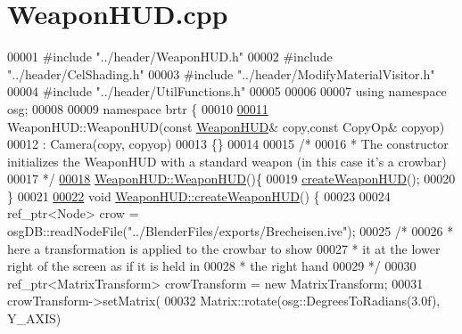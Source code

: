 \hypertarget{_weapon_h_u_d_8cpp_source}{\section{Weapon\+H\+U\+D.\+cpp}
\label{_weapon_h_u_d_8cpp_source}
}

\begin{DoxyCode}
00001 \textcolor{preprocessor}{#include "../header/WeaponHUD.h"}
00002 \textcolor{preprocessor}{#include "../header/CelShading.h"}
00003 \textcolor{preprocessor}{#include "../header/ModifyMaterialVisitor.h"}
00004 \textcolor{preprocessor}{#include "../header/UtilFunctions.h"}
00005 
00006 
00007 \textcolor{keyword}{using namespace }osg;
00008 
00009 \textcolor{keyword}{namespace }brtr \{
00010 
\hypertarget{_weapon_h_u_d_8cpp_source_l00011}{}\hyperlink{classbrtr_1_1_weapon_h_u_d_a79723105b944c088928741a620551d8d}{00011}     WeaponHUD::WeaponHUD(\textcolor{keyword}{const} \hyperlink{classbrtr_1_1_weapon_h_u_d}{WeaponHUD}& copy,\textcolor{keyword}{const} CopyOp& copyop)
00012     : Camera(copy, copyop)
00013     \{\}
00014 
00015     \textcolor{comment}{/*}
00016 \textcolor{comment}{     * The constructor initializes the WeaponHUD with a standard weapon (in this case it's a crowbar) }
00017 \textcolor{comment}{     */}
\hypertarget{_weapon_h_u_d_8cpp_source_l00018}{}\hyperlink{classbrtr_1_1_weapon_h_u_d_a8bc53d9bc7df80c28e2d9eeeed113281}{00018}     \hyperlink{classbrtr_1_1_weapon_h_u_d_a8bc53d9bc7df80c28e2d9eeeed113281}{WeaponHUD::WeaponHUD}()\{
00019         \hyperlink{classbrtr_1_1_weapon_h_u_d_a86191d6e9041afc84575e77576464da9}{createWeaponHUD}();
00020     \}
00021 
\hypertarget{_weapon_h_u_d_8cpp_source_l00022}{}\hyperlink{classbrtr_1_1_weapon_h_u_d_a86191d6e9041afc84575e77576464da9}{00022}     \textcolor{keywordtype}{void} \hyperlink{classbrtr_1_1_weapon_h_u_d_a86191d6e9041afc84575e77576464da9}{WeaponHUD::createWeaponHUD}() \{
00023     
00024         ref\_ptr<Node> crow = osgDB::readNodeFile(\textcolor{stringliteral}{"../BlenderFiles/exports/Brecheisen.ive"});
00025     \textcolor{comment}{/*}
00026 \textcolor{comment}{     * here a transformation is applied to the crowbar to show }
00027 \textcolor{comment}{     * it at the lower right of the screen as if it is held in}
00028 \textcolor{comment}{     * the right hand}
00029 \textcolor{comment}{     */}
00030         ref\_ptr<MatrixTransform> crowTransform = \textcolor{keyword}{new} MatrixTransform;
00031         crowTransform->setMatrix(
00032          Matrix::rotate(osg::DegreesToRadians(3.0f), Y\_AXIS)

\end{DoxyCode}
